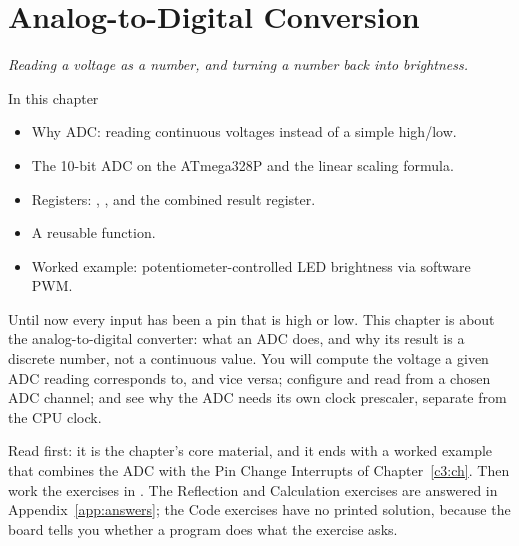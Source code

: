 
\chapter{Analog-to-Digital Conversion}
\label{c4:ch}

{\large\itshape Reading a voltage as a number, and turning a number back into brightness.\par}

\begin{chapterbox}{In this chapter}
\begin{itemize}
  \item Why ADC: reading continuous voltages instead of a simple high/low.
  \item The 10-bit ADC on the ATmega328P and the linear scaling formula.
  \item Registers: , , and the combined  result register.
  \item A reusable  function.
  \item Worked example: potentiometer-controlled LED brightness via software PWM.
\end{itemize}
\end{chapterbox}

Until now every input has been a pin that is high or low. This chapter is about the
analog-to-digital converter: what an ADC does, and why its result is a discrete number, not a
continuous value. You will compute the voltage a given ADC reading corresponds to, and vice versa;
configure and read from a chosen ADC channel; and see why the ADC needs its own clock prescaler,
separate from the CPU clock.

Read  first: it is the chapter's core material, and it ends with a worked
example that combines the ADC with the Pin Change Interrupts of Chapter~\ref{c3:ch}. Then work the
exercises in . The Reflection and Calculation exercises are answered in
Appendix~\ref{app:answers}; the Code exercises have no printed solution, because the board tells
you whether a program does what the exercise asks.




